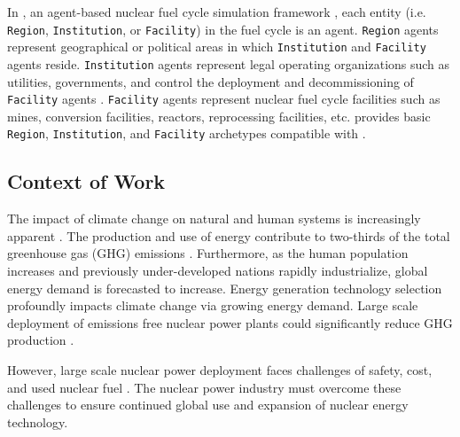 In \Cyclus, an agent-based nuclear fuel cycle simulation framework 
\cite{huff_fundamental_2016}, 
each entity (i.e. \texttt{Region}, \texttt{Institution}, or \texttt{Facility}) in the 
fuel cycle is an agent. 
\texttt{Region} agents represent geographical or political areas in which \texttt{Institution}
and \texttt{Facility} agents reside. 
\texttt{Institution} agents represent legal operating organizations such as
utilities, governments, and control the 
deployment and decommissioning of \texttt{Facility} agents
\cite{huff_fundamental_2016}.
\texttt{Facility} agents represent nuclear fuel cycle facilities
such as mines, conversion facilities, reactors, reprocessing facilities, 
etc. 
\Cycamore \cite{carlsen_cycamore_2014}
provides basic \texttt{Region}, \texttt{Institution}, 
and \texttt{Facility} archetypes compatible with \Cyclus. 

\subsection{Context of Work}
The impact of climate change on natural and human systems 
is increasingly apparent \cite{noauthor_climate_2018}.
The production and use of energy contribute to 
two-thirds of the total greenhouse gas (GHG) 
emissions \cite{noauthor_climate_2018}.
Furthermore, as the human population increases and previously 
under-developed nations rapidly industrialize, 
global energy demand is forecasted to increase. 
Energy generation technology selection 
profoundly impacts climate change via growing energy demand. 
Large scale deployment of emissions free nuclear power plants 
could significantly reduce GHG production 
\cite{noauthor_climate_2018}.    

However, large scale nuclear power deployment faces
challenges of safety, cost, and used nuclear fuel  
\cite{noauthor_future_2018}. 
The nuclear power industry must overcome these challenges 
to ensure continued global use and expansion 
of nuclear energy technology. 

